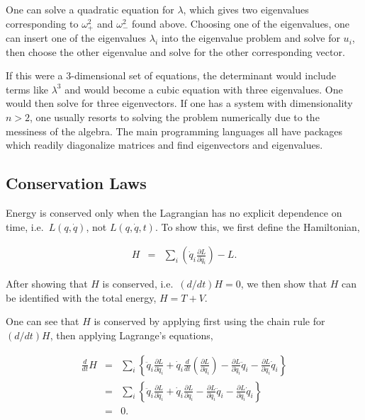 \documentclass[%
oneside,                 %
final,                   %
10pt]{article}
\begin{document}
One can solve a quadratic equation for $\lambda$, which gives two
eigenvalues corresponding to $\omega_+^2$ and $\omega_-^2$ found
above. Choosing one of the eigenvalues, one can insert one of the
eigenvalues $\lambda_i$ into the eigenvalue problem  and solve for $u_i$,
then choose the other eigenvalue and solve for the other corresponding
vector.

If this were a 3-dimensional set of equations, the determinant would
include terms like $\lambda^3$ and would become a cubic equation with
three eigenvalues. One would then solve for three eigenvectors. If one
has a system with dimensionality $n>2$, one usually resorts to solving
the problem numerically due to the messiness of the algebra. The main
programming languages all have packages which readily diagonalize
matrices and find eigenvectors and eigenvalues.

\subsection*{Conservation Laws}

Energy is conserved only when the Lagrangian has no explicit
dependence on time, i.e.~$L(q,\dot{q})$, not $L(q,\dot{q},t)$. To show
this, we first define the Hamiltonian,

\begin{eqnarray}
H&=&\sum_i\left(\dot{q}_i\frac{\partial L}{\partial\dot{q}_i}\right)-L.
\end{eqnarray}

After showing that $H$ is conserved, i.e.~$(d/dt)H=0$, we then show
that $H$ can be identified with the total energy, $H=T+V$.

One can see that $H$ is conserved by applying first using the chain
rule for $(d/dt)H$, then applying Lagrange's
equations,

\begin{eqnarray}
\frac{d}{dt}H&=&\sum_i\left\{\ddot{q}_i\frac{\partial L}{\partial\dot{q}_i}+\dot{q}_i\frac{d}{dt}\left(\frac{\partial L}{\partial\dot{q}_i}\right)-\frac{\partial L}{\partial\dot{q}_i}\ddot{q}_i-\frac{\partial L}{\partial q_i}\dot{q}_i\right\}\\
\nonumber
&=&\sum_i\left\{\ddot{q}_i\frac{\partial L}{\partial\dot{q}_i}+\dot{q}_i\frac{\partial L}{\partial q_i}-\frac{\partial L}{\partial\dot{q}_i}\ddot{q}_i-\frac{\partial L}{\partial q_i}\dot{q}_i\right\}\\
\nonumber
&=&0.
\end{eqnarray}
\end{document}
